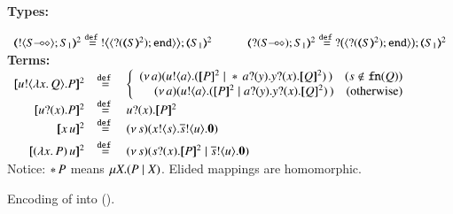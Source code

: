 \begin{figure}[t]
{\bf Types:}

$
	\begin{array}{c}
		\tmap{\btout{\lhot{S}}S_1}{2} \defeq \bbtout{\chtype{\btinp{\tmap{S}{2}}\tinact}}\tmap{S_1}{2}
		\qquad
		\quad
		\tmap{\btinp{\lhot{S}}S_1}{2} \defeq \bbtinp{\chtype{\btinp{\tmap{S}{2}}\tinact}}\tmap{S_1}{2}
	\end{array}
$
\\[2mm]
{\bf Terms:} 
\\
$
\begin{array}{rcll}
	\pmap{\bout{u}{\abs{x}{Q}} P}{2} & \defeq  &
	\left\{
	\begin{array}{r}
		\newsp{a}{\bout{u}{a} (\pmap{P}{2} \Par \repl{} \binp{a}{y} \binp{y}{x} \pmap{Q}{2})\,}\quad
		(s \notin \fn{Q})
		\\
		\newsp{a}{\bout{u}{a} (\pmap{P}{2} \Par \binp{a}{y} \binp{y}{x} \pmap{Q}{2})\,}\quad
		\textrm{(otherwise)} %
	\end{array}
	\right.
	\\[1mm]

	\pmap{\binp{u}{x} P}{2} &\defeq&  \binp{u}{x} \pmap{P}{2}
	 \\
	\pmap{\appl{x}{u}}{2} &\defeq& \newsp{s}{\bout{x}{s} \bout{\dual{s}}{u} \inact}
	\\[1mm]

	\pmap{\appl{(\abs{x}{P})}{u}}{2} & \defeq & %
	\newsp{s}{\binp{s}{x} \pmap{P}{2} \Par \bout{\dual{s}}{u} \inact}
\end{array}
$
\\[2mm]
{Notice: $\repl{} P$ means $\recp{X}{(P \Par \rvar{X})}$. Elided mappings are homomorphic.}
\caption{Encoding of \HOp into \sessp (). \label{f:enc:ho_to_sessp}}
\end{figure}

